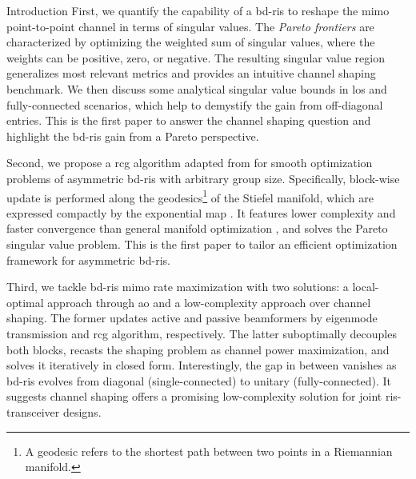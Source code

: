 \documentclass[journal]{IEEEtran}
\begin{document}
\begin{section}{Introduction}
	First, we quantify the capability of a \gls{bd}-\gls{ris} to reshape the \gls{mimo} point-to-point channel in terms of singular values.
	The \emph{Pareto frontiers} are characterized by optimizing the {weighted sum of singular values}, where the weights can be positive, zero, or negative.
	The resulting singular value region generalizes most relevant metrics and provides an intuitive channel shaping benchmark.
	We then discuss some analytical singular value bounds in \gls{los} and fully-connected scenarios, which help to demystify the gain from off-diagonal entries.
	This is the first paper to answer the channel shaping question and highlight the \gls{bd}-\gls{ris} gain from a Pareto perspective.

	Second, we propose a \gls{rcg} algorithm adapted from \cite{Abrudan2008,Abrudan2009} for smooth optimization problems of asymmetric \gls{bd}-\gls{ris} with arbitrary group size.
	Specifically, block-wise update is performed along the geodesics\footnote{A geodesic refers to the shortest path between two points in a Riemannian manifold.} of the Stiefel manifold, which are expressed compactly by the exponential map \cite{Edelman1998}.
	It features lower complexity and faster convergence than general manifold optimization \cite{Absil2009,Pan2022d}, and solves the Pareto singular value problem.
	This is the first paper to tailor an efficient optimization framework for asymmetric \gls{bd}-\gls{ris}.

	Third, we tackle \gls{bd}-\gls{ris} \gls{mimo} rate maximization with two solutions: a local-optimal approach through \gls{ao} and a low-complexity approach over channel shaping.
	The former updates active and passive beamformers by eigenmode transmission and \gls{rcg} algorithm, respectively.
	The latter suboptimally decouples both blocks, recasts the shaping problem as channel power maximization, and solves it iteratively in closed form.
	Interestingly, the gap in between vanishes as \gls{bd}-\gls{ris} evolves from diagonal (single-connected) to unitary (fully-connected).
	It suggests channel shaping offers a promising low-complexity solution for joint \gls{ris}-transceiver designs.



\end{section}
\end{document}
